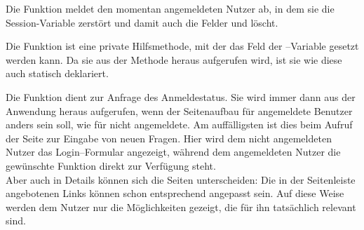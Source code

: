 Die Funktion  meldet den momentan angemeldeten Nutzer ab, in dem sie die Session-Variable zerstört und damit auch die Felder  und  löscht.

Die Funktion  ist eine private Hilfsmethode, mit der das Feld  der --Variable gesetzt werden kann. Da sie aus der Methode  heraus aufgerufen wird, ist sie wie diese auch statisch deklariert.

Die Funktion  dient zur Anfrage des Anmeldestatus. Sie wird immer dann aus der Anwendung heraus aufgerufen, wenn der Seitenaufbau für angemeldete Benutzer anders sein soll, wie für nicht angemeldete. Am auffälligsten ist dies beim Aufruf der Seite zur Eingabe von neuen Fragen. Hier wird dem nicht angemeldeten Nutzer das Login--Formular angezeigt, während dem angemeldeten Nutzer die gewünschte Funktion direkt zur Verfügung steht.\\
Aber auch in Details können sich die Seiten unterscheiden: Die in der Seitenleiste angebotenen Links können schon entsprechend angepasst sein. Auf diese Weise werden dem Nutzer nur die Möglichkeiten gezeigt, die für ihn tatsächlich relevant sind. 
